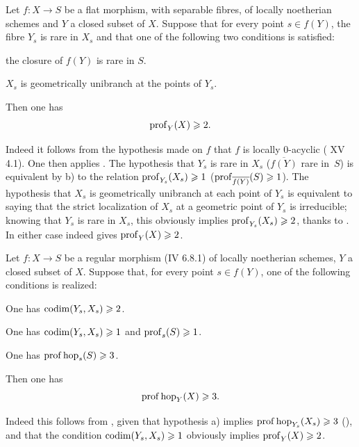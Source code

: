 \begin{corollary} \label{XIV.1.19}
Let $f:X\to S$ be a flat morphism, with separable fibres, of locally noetherian schemes and $Y$ a closed subset of $X$. Suppose that for every point $s\in f(Y)$, the fibre $Y_s$ is rare in $X_s$ and that one of the following two conditions is satisfied:
\begin{enumeratea}
\item
the closure of $f(Y)$ is rare in $S$.
\item
$X_s$ is geometrically unibranch at the points of $Y_s$.
\par\noindent
Then one has
$$
\operatorname{prof}_Y(X)\geqslant 2.
$$
\end{enumeratea}
\end{corollary}

Indeed it follows from the hypothesis made on $f$ that $f$ is locally $0$-acyclic ( XV 4.1). One then applies . The hypothesis that $Y_s$ is rare in $X_s$ (\resp $\overline{f(Y)}$ rare in~$S$) is equivalent by  b) to the relation $\operatorname{prof}_{Y_s}(X_s)\geqslant 1$ (\resp $\operatorname{prof}_{\overline{f(Y)}}(S)\geqslant 1$). The hypothesis that $X_s$ is geometrically unibranch at each point of $Y_s$ is equivalent to saying that the strict localization of $X_s$ at a geometric point of $Y_s$ is irreducible; knowing that $Y_s$ is rare in $X_s$, this obviously implies $\operatorname{prof}_{Y_s}(X_s)\geqslant 2$, thanks to . In either case  indeed gives $\operatorname{prof}_Y(X)\geqslant 2$.

\begin{corollary} \label{XIV.1.20}
Let $f:X\to S$ be a regular morphism (\textup{\EGA IV 6.8.1}) of locally noetherian schemes, $Y$ a closed subset of $X$. Suppose that, for every point $s\in f(Y)$, one of the following conditions is realized:
\begin{enumeratea}
\item
One has $\operatorname{codim}(Y_s, X_s)\geqslant 2$.
\item
One has $\operatorname{codim}(Y_s, X_s)\geqslant 1$ and $\operatorname{prof}_s(S)\geqslant 1$.
\item
One has $\operatorname{prof}\operatorname{hop}_s(S)\geqslant 3$.
\end{enumeratea}
\noindent
Then one has
$$
\operatorname{prof}\operatorname{hop}_Y(X)\geqslant 3.
$$
\end{corollary}

Indeed this follows from , given that hypothesis a) implies $\operatorname{prof}\operatorname{hop}_{Y_s}(X_s)\geqslant 3$ (\cf {}), and that the condition $\operatorname{codim}(Y_s, X_s)\geqslant 1$ obviously implies $\operatorname{prof}_Y(X)\geqslant 2$.
